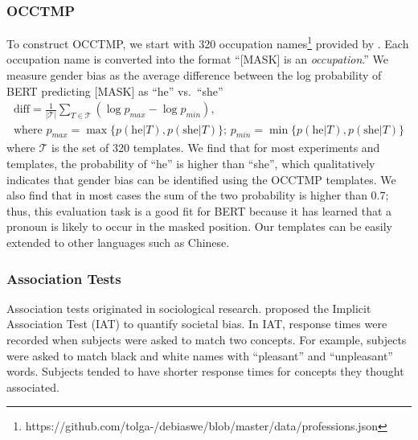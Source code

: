 \subsubsection{OCCTMP}
To construct OCCTMP, we start with 320 occupation names\footnote{https://github.com/tolga-/debiaswe/blob/master/data/professions.json} provided by . Each occupation name is converted into the format ``[MASK] is an \textit{occupation}.''
We measure gender bias as the average difference between the log probability of BERT predicting [MASK] as ``he'' vs.\ ``she''
\begin{gather*}
\text{diff}=\frac{1}{|{\mathcal T}|} \sum_{T \in
	{\mathcal T}}(\log p_{max} - \log p_{min}),\\
\mbox{where }p_{max}=\max\{p(\mbox{he}| T),p(\mbox{she}| T)\} \mbox{; }p_{min}=\min\{p(\mbox{he}| T),p(\mbox{she}| T)\}
\end{gather*}
where $\mathcal T$ is the set of 320 templates.  We find
that for most experiments and templates, the probability of
``he'' is higher than ``she'', which qualitatively indicates
that gender bias can be identified using the OCCTMP templates. We also find that in most cases the sum of the two probability is higher than 0.7; thus, this evaluation task is a good fit for BERT because it has learned that a pronoun is likely to occur in the masked position. Our templates can be easily extended to other languages such as Chinese.

\subsubsection{Association Tests}\label{sec:weat}
Association tests originated in sociological research.  proposed the Implicit Association Test (IAT) to quantify societal bias. In IAT, response times were recorded when subjects were asked to match two concepts. For example, subjects were asked to match black and white names with “pleasant” and “unpleasant” words. Subjects tended to have shorter response times for concepts they thought associated. 

